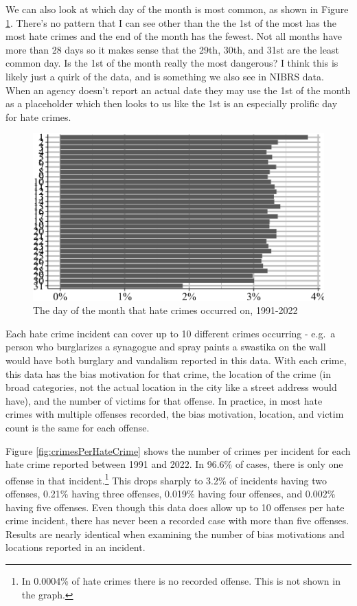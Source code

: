 \documentclass[
  12pt,
  openany]{book}
\begin{document}
We can also look at which day of the month is most common, as shown in Figure \ref{fig:hateCrimesByMonthDay}. There's no pattern that I can see other than the the 1st of the most has the most hate crimes and the end of the month has the fewest. Not all months have more than 28 days so it makes sense that the 29th, 30th, and 31st are the least common day. Is the 1st of the month really the most dangerous? I think this is likely just a quirk of the data, and is something we also see in NIBRS data. When an agency doesn't report an actual date they may use the 1st of the month as a placeholder which then looks to us like the 1st is an especially prolific day for hate crimes.

\begin{figure}

{\centering \includegraphics[width=0.9\linewidth]{09_hate_crime_files/figure-latex/hateCrimesByMonthDay-1} 

}

\caption{The day of the month that hate crimes occurred on, 1991-2022}\label{fig:hateCrimesByMonthDay}
\end{figure}

Each hate crime incident can cover up to 10 different crimes occurring - e.g.~a person who burglarizes a synagogue and spray paints a swastika on the wall would have both burglary and vandalism reported in this data. With each crime, this data has the bias motivation for that crime, the location of the crime (in broad categories, not the actual location in the city like a street address would have), and the number of victims for that offense. In practice, in most hate crimes with multiple offenses recorded, the bias motivation, location, and victim count is the same for each offense.

Figure \ref{fig:crimesPerHateCrime} shows the number of crimes per incident for each hate crime reported between 1991 and 2022. In 96.6\% of cases, there is only one offense in that incident.\footnote{In 0.0004\% of hate crimes there is no recorded offense. This is not shown in the graph.} This drops sharply to 3.2\% of incidents having two offenses, 0.21\% having three offenses, 0.019\% having four offenses, and 0.002\% having five offenses. Even though this data does allow up to 10 offenses per hate crime incident, there has never been a recorded case with more than five offenses. Results are nearly identical when examining the number of bias motivations and locations reported in an incident.
\end{document}
